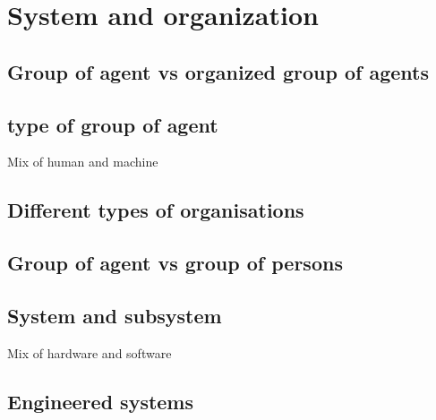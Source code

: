 \chapter{System and organization}

\section{Group of agent vs organized group of agents}

\section{type of group of agent}

Mix of human and machine

\section{Different types of organisations}

\section{Group of agent vs group of persons}

\section{System and subsystem}

Mix of hardware and software

\section{Engineered systems}

